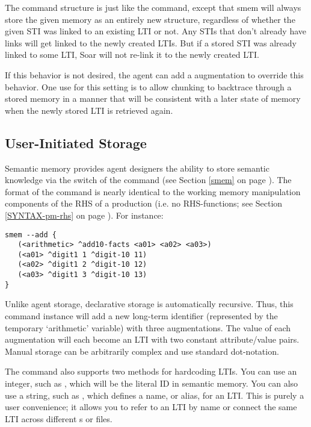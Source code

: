 The  command structure is just like the  command, except that smem will always store the given memory as an entirely new structure, regardless of whether the given STI was linked to an existing LTI or not. Any STIs that don't already have links will get linked to the newly created LTIs. But if a stored STI was already linked to some LTI, Soar will not re-link it to the newly created LTI.

If this behavior is not desired, the agent can add a  augmentation to override this behavior. One use for this setting is to allow chunking to backtrace through a stored memory in a manner that will be consistent with a later state of memory when the newly stored LTI is retrieved again.

\subsection{User-Initiated Storage}

Semantic memory provides agent designers the ability to store semantic knowledge via the  switch of the  command (see Section \ref{smem} on page \pageref{smem}).
The format of the command is nearly identical to the working memory manipulation components of the RHS of a production (i.e. no RHS-functions; see Section \ref{SYNTAX-pm-rhs} on page \pageref{SYNTAX-pm-rhs}).
For instance:

\begin{verbatim}
smem --add {
   (<arithmetic> ^add10-facts <a01> <a02> <a03>)
   (<a01> ^digit1 1 ^digit-10 11)
   (<a02> ^digit1 2 ^digit-10 12)
   (<a03> ^digit1 3 ^digit-10 13)
}
\end{verbatim}

Unlike agent storage, declarative storage is automatically recursive.
Thus, this command instance will add a new long-term identifier (represented by the temporary `arithmetic' variable) with three augmentations.
The value of each augmentation will each become an LTI with two constant attribute/value pairs.
Manual storage can be arbitrarily complex and use standard dot-notation.

The  command also supports two methods for hardcoding LTIs.
You can use an integer, such as , which will be the literal ID in semantic memory.
You can also use a string, such as , which defines a name, or alias, for an LTI.
This is purely a user convenience; it allows you to refer to an LTI by name
or connect the same LTI across different s or files.

